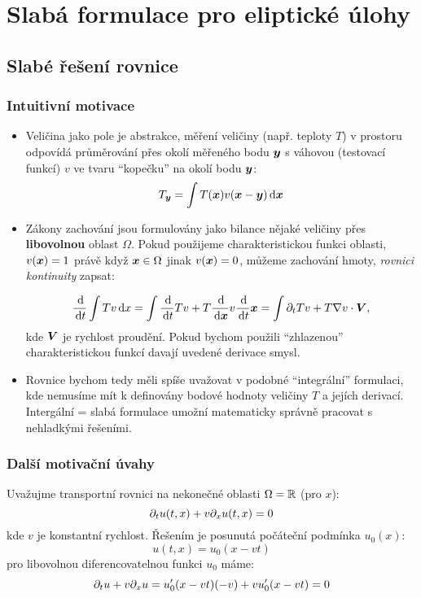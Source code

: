 \section{Slabá formulace pro eliptické úlohy}

\subsection{Slabé řešení rovnice}
\subsubsection{Intuitivní motivace}
\begin{itemize}
 \item Veličina jako pole je abstrakce, měření veličiny (např. teploty $T$) v prostoru odpovídá průměrování 
       přes okolí měřeného bodu $\mathbf{\boldsymbol{y}}$ s váhovou (testovací funkcí) $v$ ve tvaru ``kopečku'' 
       na okolí bodu $\mathbf{\boldsymbol{y}}$:
       \[
       T_{\mathbf{\boldsymbol{y}}} = \int T(\mathbf{\boldsymbol{x}}) v(\mathbf{\boldsymbol{x}} - \mathbf{\boldsymbol{y}}) \,{\rm d} \mathbf{\boldsymbol{x}}
       \]
 \item Zákony zachování jsou formulovány jako bilance nějaké veličiny přes {\bf libovolnou} oblast 
       $\Omega$. Pokud použijeme charakteristickou funkci oblasti, $v(\mathbf{\boldsymbol{x}}) = 1$ 
       právě když $\mathbf{\boldsymbol{x}} \in \Omega$ jinak $v(\mathbf{\boldsymbol{x}}) = 0$, můžeme zachování hmoty, 
       \emph{rovnici kontinuity} zapsat:
       
       \[
          \frac{\,{\rm d}}{\,{\rm d} t} \int T v \,{\rm d} x = \int \frac{\,{\rm d}}{\,{\rm d} t} T v 
          + T \frac{\,{\rm d}}{\,{\rm d} \mathbf{\boldsymbol{x}}}v \frac{\,{\rm d}}{\,{\rm d} t} \mathbf{\boldsymbol{x}} = \int \partial_t T v + T \nabla v \cdot \mathbf{\boldsymbol{V}},
       \]
       kde $\mathbf{\boldsymbol{V}}$ je rychlost proudění. Pokud bychom použili ``zhlazenou'' charakteristickou funkcí 
       davají uvedené derivace smysl. 
       
 \item Rovnice bychom tedy měli spíše uvažovat v podobné ``integrální'' formulaci, 
       kde nemusíme mít k definovány bodové hodnoty veličiny $T$ a jejích derivací. 
       Intergální = slabá formulace umožní matematicky správně pracovat s nehladkými řešeními. 
\end{itemize}



\subsubsection{Další motivační úvahy}
Uvažujme transportní rovnici na nekonečné oblasti $\Omega = {\mathbb R}$ (pro $x$):
\begin{equation}
    \label{eq:point_transport_1d}
    \partial_t u(t,x) + v\partial_x u(t,x) =0 
\end{equation}
kde $v$ je konstantní rychlost. Řešením je posunutá počáteční podmínka $u_0(x)$:
\[
    u(t,x) = u_0(x-vt)
\]
pro libovolnou diferencovatelnou funkci $u_0$ máme:
\[
    \partial_t u + v\partial_x u=u_0'(x-vt)(-v) + vu_0'(x-vt)=0
\]


